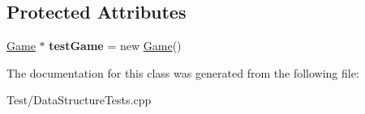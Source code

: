 \subsection*{Protected Attributes}
\begin{DoxyCompactItemize}
\item 
\mbox{\label{classDtataSturctureTests_a6e6c4b1daf0275c60da92a16d2e16b2d}} 
\hyperlink{classGame}{Game} $\ast$ {\bfseries test\+Game} = new \hyperlink{classGame}{Game}()
\end{DoxyCompactItemize}


The documentation for this class was generated from the following file\+:\begin{DoxyCompactItemize}
\item 
Test/Data\+Structure\+Tests.\+cpp\end{DoxyCompactItemize}
